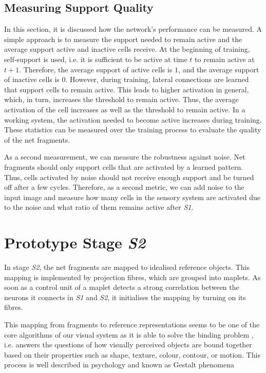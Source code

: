 \subsection{Measuring Support Quality}
In this section, it is discussed how the network's performance can be measured.
A simple approach is to measure the support needed to remain active and the average support active and inactive cells receive.
At the beginning of training, self-support is used, i.e. it is sufficient to be active at time $t$ to remain active at $t+1$.
Therefore, the average support of active cells is $1$, and the average support of inactive cells is $0$.
However, during training, lateral connections are learned that support cells to remain active.
This leads to higher activation in general, which, in turn, increases the threshold to remain active.
Thus, the average activation of the cell increases as well as the threshold to remain active.
In a working system, the activation needed to become active increases during training.
These statistics can be measured over the training process to evaluate the quality of the net fragments.

As a second measurement, we can measure the robustness against noise.
Net fragments should only support cells that are activated by a learned pattern. Thus, cells activated by noise should not receive enough support and be turned off after a few cycles.
Therefore, as a second metric, we can add noise to the input image and measure how many cells in the sensory system are activated due to the noise and what ratio of them remains active after \emph{S1}.









\section{Prototype Stage \emph{S2}}
In stage \emph{S2}, the net fragments are mapped to idealised reference objects.
This mapping is implemented by projection fibres, which are grouped into maplets.
As soon as a control unit of a maplet detects a strong correlation between the neurons it connects in \emph{S1} and \emph{S2}, it initialises the mapping by turning on its fibres.

This mapping from fragments to reference representations seems to be one of the core algorithms of our visual system as it is able to solve the binding problem , i.e. answers the questions of how visually perceived objects are bound together based on their properties such as shape, texture, colour, contour, or motion. This process is well described in psychology and known as Gestalt phenomena 

